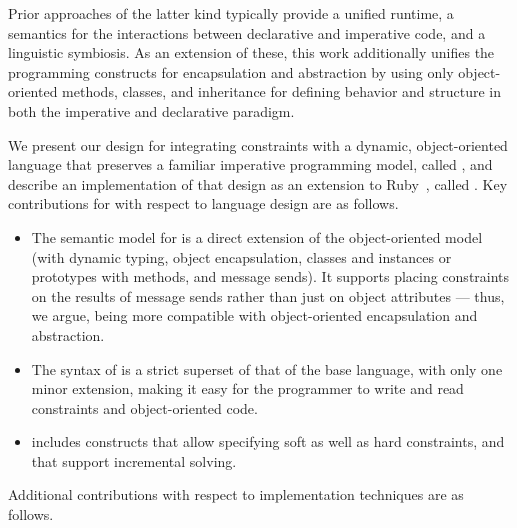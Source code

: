 Prior approaches of the latter kind typically provide a unified
runtime, a semantics for the interactions between declarative and
imperative code, and a linguistic symbiosis. As an extension of these,
this work additionally unifies the programming constructs for
encapsulation and abstraction by using only object-oriented methods,
classes, and inheritance for defining behavior and structure in both
the imperative and declarative paradigm.

We present our design for integrating constraints with a dynamic,
object-oriented language that preserves a familiar imperative
programming model, called \langname, and describe an implementation of
that design as an extension to Ruby~\cite{flanagan2008ruby}, called
\toolname. Key contributions for \langname with respect to language
design are as follows.

\begin{itemize}
\item The semantic model for \langname is a direct extension of the
  object-oriented model (with dynamic typing, object encapsulation,
  classes and instances or prototypes with methods, and message
  sends).  It supports placing constraints on the results of message
  sends rather than just on object attributes --- thus, we argue,
  being more compatible with object-oriented encapsulation and
  abstraction.
\item The syntax of \langname is a strict superset of that of the base
  language, with only one minor extension, making it easy for the
  programmer to write and read constraints and object-oriented code.
\item \langname includes constructs that allow specifying soft as well
  as hard constraints, and that support incremental solving.
\end{itemize}


Additional contributions with respect to implementation techniques are
as follows.

